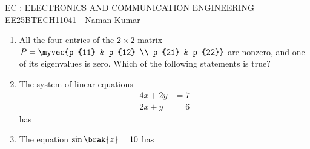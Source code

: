 \documentclass[a4paper, 11pt]{article}
\begin{document}
\begin{center}
    \huge{EC : ELECTRONICS AND COMMUNICATION ENGINEERING}\\
    \large{EE25BTECH11041 - Naman Kumar}
\end{center}

\begin{enumerate}
    \item All the four entries of the $2\times2$ matrix $P=\myvec{p_{11} & p_{12} \\ p_{21} & p_{22}}$ are nonzero, and one of its eigenvalues is zero. Which of the following statements is true?
    
    \begin{enumerate}
    \end{enumerate}

    \hfill{}

    \item The system of linear equations
    \begin{align*}
        4x+2y &= 7 \\
        2x+y &= 6
    \end{align*}
    has
    
    \begin{enumerate}
    \end{enumerate}
    
    \hfill{}

    \item The equation $\sin\brak{z}=10$ has
    
    \begin{enumerate}
    \end{enumerate}
    

\end{enumerate}
\end{document}
